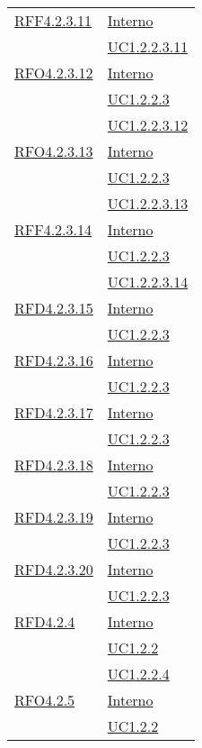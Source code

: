 \begin{longtable}{|>{\centering}m{5cm}|m{5cm}<{\centering}|}
\hyperlink{RFF4.2.3.11}{RFF4.2.3.11} & \hyperlink{Interno}{Interno}\\
& \hyperref[UC1.2.2.3.11]{UC1.2.2.3.11}\\ \hline
\hyperlink{RFO4.2.3.12}{RFO4.2.3.12} & \hyperlink{Interno}{Interno}\\
& \hyperref[UC1.2.2.3]{UC1.2.2.3}\\
& \hyperref[UC1.2.2.3.12]{UC1.2.2.3.12}\\ \hline
\hyperlink{RFO4.2.3.13}{RFO4.2.3.13} & \hyperlink{Interno}{Interno}\\
& \hyperref[UC1.2.2.3]{UC1.2.2.3}\\
& \hyperref[UC1.2.2.3.13]{UC1.2.2.3.13}\\ \hline
\hyperlink{RFF4.2.3.14}{RFF4.2.3.14} & \hyperlink{Interno}{Interno}\\
& \hyperref[UC1.2.2.3]{UC1.2.2.3}\\
& \hyperref[UC1.2.2.3.14]{UC1.2.2.3.14}\\ \hline
\hyperlink{RFD4.2.3.15}{RFD4.2.3.15} & \hyperlink{Interno}{Interno}\\
& \hyperref[UC1.2.2.3]{UC1.2.2.3}\\ \hline
\hyperlink{RFD4.2.3.16}{RFD4.2.3.16} & \hyperlink{Interno}{Interno}\\
& \hyperref[UC1.2.2.3]{UC1.2.2.3}\\ \hline
\hyperlink{RFD4.2.3.17}{RFD4.2.3.17} & \hyperlink{Interno}{Interno}\\
& \hyperref[UC1.2.2.3]{UC1.2.2.3}\\ \hline
\hyperlink{RFD4.2.3.18}{RFD4.2.3.18} & \hyperlink{Interno}{Interno}\\
& \hyperref[UC1.2.2.3]{UC1.2.2.3}\\ \hline
\hyperlink{RFD4.2.3.19}{RFD4.2.3.19} & \hyperlink{Interno}{Interno}\\
& \hyperref[UC1.2.2.3]{UC1.2.2.3}\\ \hline
\hyperlink{RFD4.2.3.20}{RFD4.2.3.20} & \hyperlink{Interno}{Interno}\\
& \hyperref[UC1.2.2.3]{UC1.2.2.3}\\ \hline
\hyperlink{RFD4.2.4}{RFD4.2.4} & \hyperlink{Interno}{Interno}\\
& \hyperref[UC1.2.2]{UC1.2.2}\\
& \hyperref[UC1.2.2.4]{UC1.2.2.4}\\ \hline
\hyperlink{RFO4.2.5}{RFO4.2.5} & \hyperlink{Interno}{Interno}\\
& \hyperref[UC1.2.2]{UC1.2.2}\\

\end{longtable}
